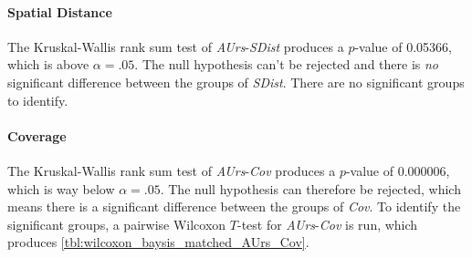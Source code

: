 \paragraph{Spatial Distance}
The Kruskal-Wallis rank sum test of \textit{AUrs}-\textit{SDist} produces a $p$-value of 0.05366, which is above $\alpha=.05$. The null hypothesis can't be rejected and there is \textit{no} significant difference between the groups of \textit{SDist}. There are no significant groups to identify.

\paragraph{Coverage}
The Kruskal-Wallis rank sum test of \textit{AUrs}-\textit{Cov} produces a $p$-value of 0.000006, which is way below $\alpha=.05$. The null hypothesis can therefore be rejected, which means there is a significant difference between the groups of \textit{Cov}. To identify the significant groups, a pairwise Wilcoxon $T$-test for \textit{AUrs}-\textit{Cov} is run, which produces \cref{tbl:wilcoxon_baysis_matched_AUrs_Cov}.
